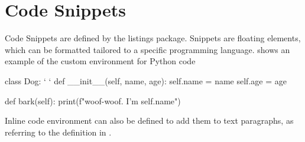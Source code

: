 

\section{Code Snippets}
\label{sec:code}

Code Snippets are defined by the listings package. Snippets are floating elements, which can be formatted tailored to a specific programming language.  shows an example of the custom environment for Python code

\begin{python}[numbers=left, frame=lines, 
   label={lst:python}, 
  caption={Python code example}]
class Dog:   `\label{ln:class} `
    def __init__(self, name, age):
        self.name = name
        self.age = age

    def bark(self):
        print(f"woof-woof. I'm {self.name}")
\end{python}

Inline code environment can also be defined to add them to text paragraphs, as referring to the  definition in .

\endinput